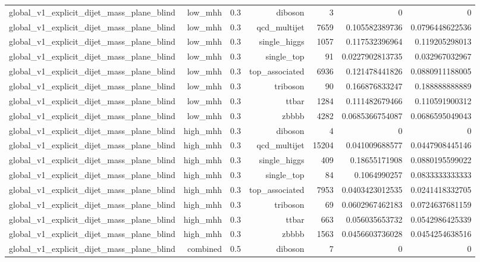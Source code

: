 \begin{table}[htbp]
{\begin{tabular}{lrrrrrr}
global\_v1\_explicit\_dijet\_mass\_plane\_blind & low\_mhh & 0.3 & diboson & 3 & 0 & 0 \\
global\_v1\_explicit\_dijet\_mass\_plane\_blind & low\_mhh & 0.3 & qcd\_multijet & 7659 & 0.105582389736 & 0.0796448622536 \\
global\_v1\_explicit\_dijet\_mass\_plane\_blind & low\_mhh & 0.3 & single\_higgs & 1057 & 0.117532396964 & 0.119205298013 \\
global\_v1\_explicit\_dijet\_mass\_plane\_blind & low\_mhh & 0.3 & single\_top & 91 & 0.0227902813735 & 0.032967032967 \\
global\_v1\_explicit\_dijet\_mass\_plane\_blind & low\_mhh & 0.3 & top\_associated & 6936 & 0.121478441826 & 0.0880911188005 \\
global\_v1\_explicit\_dijet\_mass\_plane\_blind & low\_mhh & 0.3 & triboson & 90 & 0.166876833247 & 0.188888888889 \\
global\_v1\_explicit\_dijet\_mass\_plane\_blind & low\_mhh & 0.3 & ttbar & 1284 & 0.111482679466 & 0.110591900312 \\
global\_v1\_explicit\_dijet\_mass\_plane\_blind & low\_mhh & 0.3 & zbbbb & 4282 & 0.0685366754087 & 0.0686595049043 \\
global\_v1\_explicit\_dijet\_mass\_plane\_blind & high\_mhh & 0.3 & diboson & 4 & 0 & 0 \\
global\_v1\_explicit\_dijet\_mass\_plane\_blind & high\_mhh & 0.3 & qcd\_multijet & 15204 & 0.041009688577 & 0.0447908445146 \\
global\_v1\_explicit\_dijet\_mass\_plane\_blind & high\_mhh & 0.3 & single\_higgs & 409 & 0.18655171908 & 0.0880195599022 \\
global\_v1\_explicit\_dijet\_mass\_plane\_blind & high\_mhh & 0.3 & single\_top & 84 & 0.1064990257 & 0.0833333333333 \\
global\_v1\_explicit\_dijet\_mass\_plane\_blind & high\_mhh & 0.3 & top\_associated & 7953 & 0.0403423012535 & 0.0241418332705 \\
global\_v1\_explicit\_dijet\_mass\_plane\_blind & high\_mhh & 0.3 & triboson & 69 & 0.0602967462183 & 0.0724637681159 \\
global\_v1\_explicit\_dijet\_mass\_plane\_blind & high\_mhh & 0.3 & ttbar & 663 & 0.056035653732 & 0.0542986425339 \\
global\_v1\_explicit\_dijet\_mass\_plane\_blind & high\_mhh & 0.3 & zbbbb & 1563 & 0.0456603736028 & 0.0454254638516 \\
global\_v1\_explicit\_dijet\_mass\_plane\_blind & combined & 0.5 & diboson & 7 & 0 & 0 \\

\end{tabular}}
\end{table}
